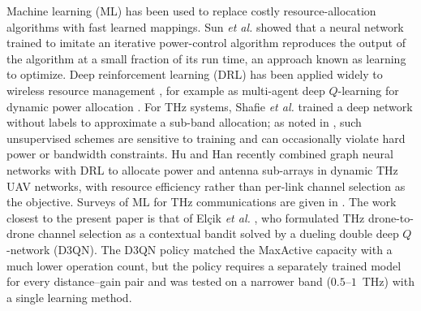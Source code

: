 \documentclass{ieee-ojvt}
\begin{document}
Machine learning (ML) has been used to replace costly resource-allocation algorithms with
fast learned mappings. Sun \emph{et al.} \cite{sun2018learning} showed that a neural
network trained to imitate an iterative power-control algorithm reproduces the output of
the algorithm at a small fraction of its run time, an approach known as learning to
optimize. Deep reinforcement learning (DRL) has been applied widely to wireless resource
management \cite{luong2019drl}, for example as multi-agent deep $Q$-learning for dynamic
power allocation \cite{nasir2019marl}. For THz systems, Shafie \emph{et al.}
\cite{shafie2022unsupervised} trained a deep network without labels to approximate a
sub-band allocation; as noted in \cite{elcik2025d3qn}, such unsupervised schemes are
sensitive to training and can occasionally violate hard power or bandwidth constraints.
Hu and Han \cite{hu2025glove} recently combined graph neural networks with DRL to
allocate power and antenna sub-arrays in dynamic THz UAV networks, with resource
efficiency rather than per-link channel selection as the objective. Surveys of ML for THz
communications are given in \cite{farhad2023thzai}. The work closest to the present paper
is that of Elçik \emph{et al.} \cite{elcik2025d3qn}, who formulated THz drone-to-drone
channel selection as a contextual bandit solved by a dueling double deep $Q$-network
(D3QN). The D3QN policy matched the MaxActive capacity with a much lower operation count,
but the policy requires a separately trained model for every distance--gain pair and was
tested on a narrower band ($0.5$--$1$~THz) with a single learning method.
\end{document}
